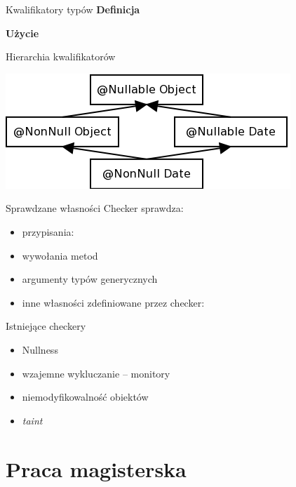 \documentclass{beamer}
\begin{document}
\begin{frame}{Kwalifikatory typów}
  \textbf{Definicja}
  
  \textbf{Użycie}
  
\end{frame}
  
\begin{frame}{Hierarchia kwalifikatorów}
  
  \begin{center}
    \includegraphics[scale=0.5]{img/nullness.png}
  \end{center}
\end{frame}

\begin{frame}{Sprawdzane własności}
  Checker sprawdza:
  \begin{itemize}
  \item<1-> przypisania:
    
  \item<2-> wywołania metod
  \item<2-> argumenty typów generycznych
  \item<3-> inne własności zdefiniowane przez checker:
    
  \end{itemize}
\end{frame}

\begin{frame}{Istniejące checkery}
\begin{itemize}
\item<1-> Nullness
\item<2-> wzajemne wykluczanie -- monitory
\item<3-> niemodyfikowalność obiektów
\item<4-> \emph{taint}
\end{itemize}
\end{frame}

\section{Praca magisterska}
\end{document}
